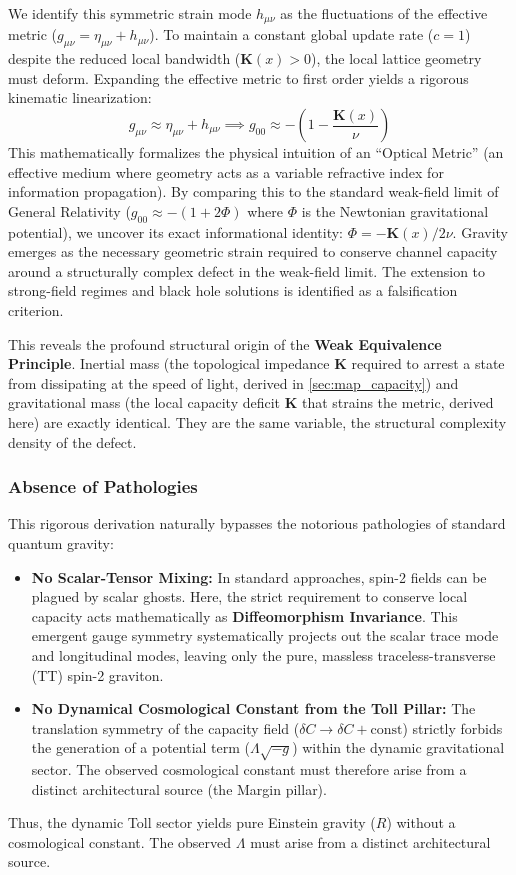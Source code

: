 We identify this symmetric strain mode $h_{\mu\nu}$ as the fluctuations of the effective metric ($g_{\mu\nu} = \eta_{\mu\nu} + h_{\mu\nu}$). To maintain a constant global update rate ($c=1$) despite the reduced local bandwidth ($\mathbf{K}(x) > 0$), the local lattice geometry must deform. Expanding the effective metric to first order yields a rigorous kinematic linearization:
\begin{equation}
g_{\mu\nu} \approx \eta_{\mu\nu} + h_{\mu\nu} \implies g_{00} \approx -\left( 1 - \frac{\mathbf{K}(x)}{\nu} \right)
\end{equation}
This mathematically formalizes the physical intuition of an ``Optical Metric'' (an effective medium where geometry acts as a variable refractive index for information propagation). By comparing this to the standard weak-field limit of General Relativity ($g_{00} \approx -(1+2\Phi)$ where $\Phi$ is the Newtonian gravitational potential), we uncover its exact informational identity: $\Phi = -\mathbf{K}(x)/2\nu$. Gravity emerges as the necessary geometric strain required to conserve channel capacity around a structurally complex defect in the weak-field limit. The extension to strong-field regimes and black hole solutions is identified as a falsification criterion.

This reveals the profound structural origin of the \textbf{Weak Equivalence Principle}. Inertial mass (the topological impedance $\mathbf{K}$ required to arrest a state from dissipating at the speed of light, derived in \cref{sec:map_capacity}) and gravitational mass (the local capacity deficit $\mathbf{K}$ that strains the metric, derived here) are exactly identical. They are the same variable, the structural complexity density of the defect.

\subsubsection{Absence of Pathologies}
This rigorous derivation naturally bypasses the notorious pathologies of standard quantum gravity:
\begin{itemize}
    \item \textbf{No Scalar-Tensor Mixing:} In standard approaches, spin-2 fields can be plagued by scalar ghosts. Here, the strict requirement to conserve local capacity acts mathematically as \textbf{Diffeomorphism Invariance}. This emergent gauge symmetry systematically projects out the scalar trace mode and longitudinal modes, leaving only the pure, massless traceless-transverse (TT) spin-2 graviton.
    \item \textbf{No Dynamical Cosmological Constant from the Toll Pillar:} The translation symmetry of the capacity field ($\delta C \to \delta C + \text{const}$) strictly forbids the generation of a potential term ($\Lambda \sqrt{-g}$) within the dynamic gravitational sector. The observed cosmological constant must therefore arise from a distinct architectural source (the Margin pillar).
\end{itemize}
Thus, the dynamic Toll sector yields pure Einstein gravity ($R$) without a cosmological constant. The observed $\Lambda$ must arise from a distinct architectural source.

